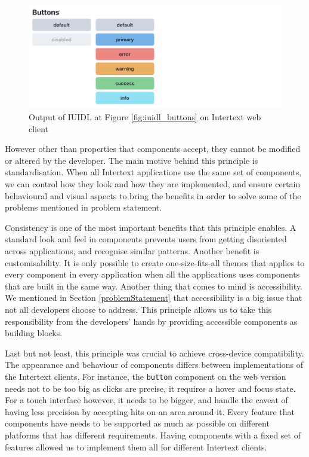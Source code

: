 \begin{figure}
  \centering
  \includegraphics[width=13cm]{thesis/paper/images/buttons.png}
  \caption{Output of IUIDL at Figure \ref{fig:iuidl_buttons} on Intertext web client}%
  \label{fig:iuidl_buttons_output}%
\end{figure}

However other than properties that components accept, they cannot be modified or altered by the developer. The main motive behind this principle is standardisation. When all Intertext applications use the same set of components, we can control how they look and how they are implemented, and ensure certain behavioural and visual aspects to bring the benefits in order to solve some of the problems mentioned in problem statement.

Consistency is one of the most important benefits that this principle enables. A standard look and feel in components prevents users from getting disoriented across applications, and recognise similar patterns. Another benefit is customisability. It is only possible to create one-size-fits-all themes that applies to every component in every application when all the applications uses components that are built in the same way. Another thing that comes to mind is accessibility. We mentioned in Section \ref{problemStatement} that accessibility is a big issue that not all developers choose to address. This principle allows us to take this responsibility from the developers' hands by providing accessible components as building blocks. 

Last but not least, this principle was crucial to achieve cross-device compatibility. The appearance and behaviour of components differs between implementations of the Intertext clients. For instance, the \texttt{button} component on the web version needs not to be too big as clicks are precise, it requires a hover and focus state. For a touch interface however, it needs to be bigger, and handle the caveat of having less precision by accepting hits on an area around it. Every feature that components have needs to be supported as much as possible on different platforms that has different requirements. Having components with a fixed set of features allowed us to implement them all for different Intertext clients.

